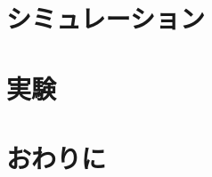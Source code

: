 \documentclass[a4j,11pt,twoside]{jbook}
\begin{document}
\chapter{シミュレーション}



\chapter{実験}



\chapter{おわりに}





\end{document}
